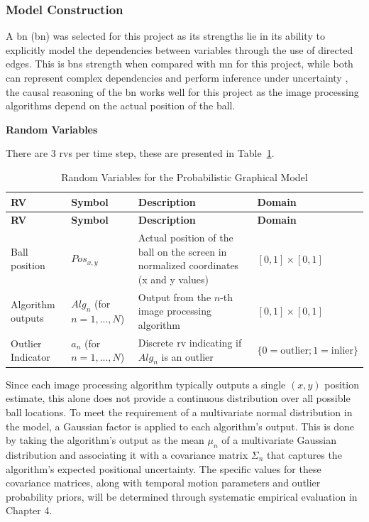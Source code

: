 \documentclass[12pt,a4paper]{article}
\begin{document}
\subsubsection{Model Construction}
A \acs{bn} (\acl{bn}) was selected for this project as its strengths lie in its ability to explicitly model the dependencies between variables through the use of directed edges. This is \acs{bn}s strength when compared with \acs{mn} for this project, while both can represent complex dependencies and perform inference under uncertainty \parencite{koller2009pgm}, the causal reasoning of the \acs{bn} works well for this project as the image processing algorithms depend on the actual position of the ball.

\textbf{Random Variables}

There are 3 \acs{rv}s per time step, these are presented in Table~\ref{tab:rvs}. 

\begin{longtable}{p{} p{} p{} p{}}
\caption{Random Variables for the Probabilistic Graphical Model} \label{tab:rvs} \\
\hline
\textbf{RV} & \textbf{Symbol} & \textbf{Description} & \textbf{Domain} \\
\hline
\endfirsthead
\hline
\textbf{RV} & \textbf{Symbol} & \textbf{Description} & \textbf{Domain} \\
\hline
\endhead
\hline
\endfoot
\hline
\endlastfoot
		Ball position & $Pos_{x,y}$ & Actual position of the ball on the screen in normalized coordinates (x and y values) & $[0, 1] \times [0, 1]$ \\
		Algorithm outputs & $Alg_n$ (for $n=1,...,N$) & Output from the $n$-th image processing algorithm & $[0, 1] \times [0, 1]$ \\
		Outlier Indicator & $a_n$ (for $n=1,...,N$) & Discrete \acs{rv} indicating if $Alg_n$ is an outlier & $\{0 = \text{outlier}; 1 = \text{inlier}\}$ \\
\end{longtable}

Since each image processing algorithm typically outputs a single $(x, y)$ position estimate, this alone does not provide a continuous distribution over all possible ball locations. To meet the requirement of a multivariate normal distribution in the model, a Gaussian factor is applied to each algorithm’s output. This is done by taking the algorithm's output as the mean $\mu_n$ of a multivariate Gaussian distribution and associating it with a covariance matrix $\Sigma_n$ that captures the algorithm's expected positional uncertainty. The specific values for these covariance matrices, along with temporal motion parameters and outlier probability priors, will be determined through systematic empirical evaluation in Chapter 4.
\end{document}
